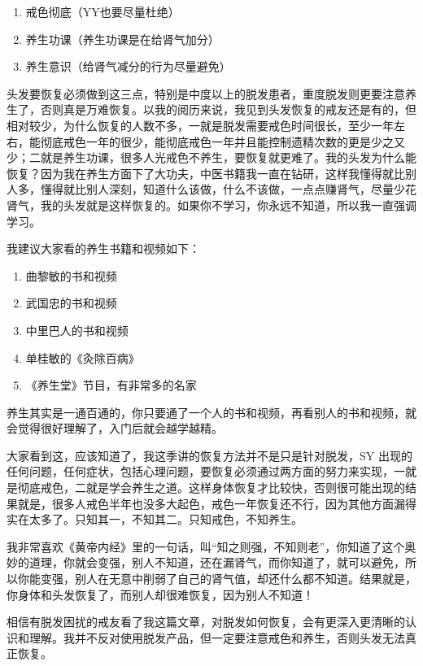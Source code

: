 \documentclass{ctexart}
\begin{document}
\begin{enumerate}
    \item 戒色彻底（YY也要尽量杜绝）
    \item 养生功课（养生功课是在给肾气加分）
    \item 养生意识（给肾气减分的行为尽量避免）
\end{enumerate}

头发要恢复必须做到这三点，特别是中度以上的脱发患者，重度脱发则更要注意养生了，否则真是万难恢复。以我的阅历来说，我见到头发恢复的戒友还是有的，但相对较少，为什么恢复的人数不多，一就是脱发需要戒色时间很长，至少一年左右，能彻底戒色一年的很少，能彻底戒色一年并且能控制遗精次数的更是少之又少；二就是养生功课，很多人光戒色不养生，要恢复就更难了。我的头发为什么能恢复？因为我在养生方面下了大功夫，中医书籍我一直在钻研，这样我懂得就比别人多，懂得就比别人深刻，知道什么该做，什么不该做，一点点赚肾气，尽量少花肾气，我的头发就是这样恢复的。如果你不学习，你永远不知道，所以我一直强调学习。

我建议大家看的养生书籍和视频如下：

\begin{enumerate}
    \item 曲黎敏的书和视频
    \item 武国忠的书和视频
    \item 中里巴人的书和视频
    \item 单桂敏的《灸除百病》
    \item 《养生堂》节目，有非常多的名家
\end{enumerate}

养生其实是一通百通的，你只要通了一个人的书和视频，再看别人的书和视频，就会觉得很好理解了，入门后就会越学越精。

大家看到这，应该知道了，我这季讲的恢复方法并不是只是针对脱发，SY 出现的任何问题，任何症状，包括心理问题，要恢复必须通过两方面的努力来实现，一就是彻底戒色，二就是学会养生之道。这样身体恢复才比较快，否则很可能出现的结果就是，很多人戒色半年也没多大起色，戒色一年恢复还不行，因为其他方面漏得实在太多了。只知其一，不知其二。只知戒色，不知养生。

我非常喜欢《黄帝内经》里的一句话，叫“知之则强，不知则老”，你知道了这个奥妙的道理，你就会变强，别人不知道，还在漏肾气，而你知道了，就可以避免，所以你能变强，别人在无意中削弱了自己的肾气值，却还什么都不知道。结果就是，你身体和头发恢复了，而别人却很难恢复，因为别人不知道！

相信有脱发困扰的戒友看了我这篇文章，对脱发如何恢复，会有更深入更清晰的认识和理解。我并不反对使用脱发产品，但一定要注意戒色和养生，否则头发无法真正恢复。
\end{document}
